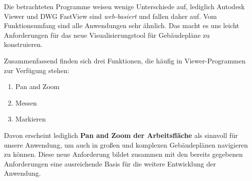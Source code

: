 Die betrachteten Programme weisen wenige Unterschiede auf, lediglich Autodesk Viewer und DWG FastView sind \textit{web-basiert} und fallen daher auf.
Vom Funktionsumfang sind alle Anwendungen sehr ähnlich.
Das macht es uns leicht Anforderungen für das neue Visualisierungstool für Gebäudepläne zu konstruieren.

Zusammenfassend finden sich drei Funktionen, die häufig in Viewer-Programmen zur Verfügung stehen:

\begin{enumerate}
    \item Pan and Zoom
    \item Messen
    \item Markieren
\end{enumerate}

Davon erscheint lediglich \textbf{Pan and Zoom der Arbeitsfläche} als sinnvoll für unsere Anwendung, um auch in großen und komplexen Gebäudeplänen navigieren zu können.
Diese neue Anforderung bildet zusammen mit den bereits gegebenen Anforderungen eine ausreichende Basis für die weitere Entwicklung der Anwendung.
